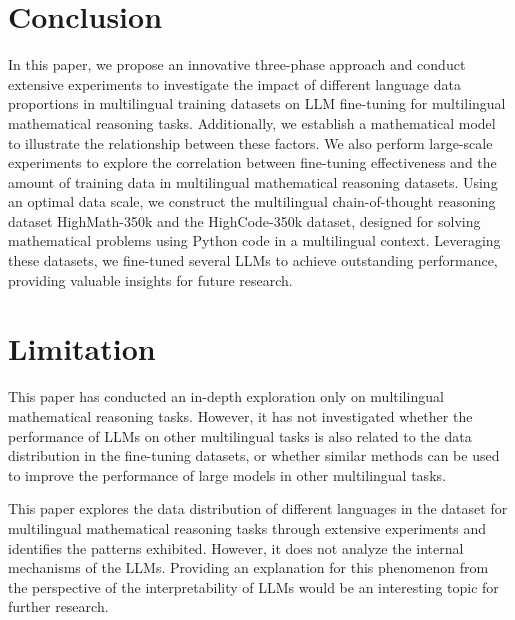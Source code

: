 \documentclass[11pt]{article}
\begin{document}
\section{Conclusion}

In this paper, we propose an innovative three-phase approach and conduct extensive experiments to investigate the impact of different language data proportions in multilingual training datasets on LLM fine-tuning for multilingual mathematical reasoning tasks. Additionally, we establish a mathematical model to illustrate the relationship between these factors. We also perform large-scale experiments to explore the correlation between fine-tuning effectiveness and the amount of training data in multilingual mathematical reasoning datasets. Using an optimal data scale, we construct the multilingual chain-of-thought reasoning dataset HighMath-350k and the HighCode-350k dataset, designed for solving mathematical problems using Python code in a multilingual context. Leveraging these datasets, we fine-tuned several LLMs to achieve outstanding performance, providing valuable insights for future research.



\clearpage
\section*{Limitation}

This paper has conducted an in-depth exploration only on multilingual mathematical reasoning tasks. However, it has not investigated whether the performance of LLMs on other multilingual tasks is also related to the data distribution in the fine-tuning datasets, or whether similar methods can be used to improve the performance of large models in other multilingual tasks.

This paper explores the data distribution of different languages in the dataset for multilingual mathematical reasoning tasks through extensive experiments and identifies the patterns exhibited. However, it does not analyze the internal mechanisms of the LLMs. Providing an explanation for this phenomenon from the perspective of the interpretability of LLMs would be an interesting topic for further research.


%



\appendix
\onecolumn
\end{document}
